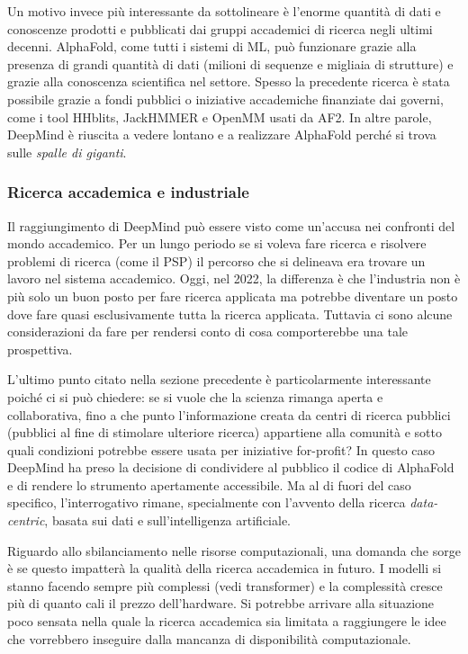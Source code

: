 {\par Un motivo invece più interessante da sottolineare è l'enorme quantità di dati e conoscenze prodotti e pubblicati dai gruppi accademici di ricerca negli ultimi decenni. AlphaFold, come tutti i sistemi di ML, può funzionare grazie alla presenza di grandi quantità di dati (milioni di sequenze e migliaia di strutture) e grazie alla conoscenza scientifica nel settore. Spesso la precedente ricerca è stata possibile grazie a fondi pubblici o iniziative accademiche finanziate dai governi, come i tool HHblits, JackHMMER e OpenMM usati da AF2. In altre parole, DeepMind è riuscita a vedere lontano e a realizzare AlphaFold perché si trova sulle \textit{spalle di giganti}.

\subsubsection{Ricerca accademica e industriale}

 \par Il raggiungimento di DeepMind può essere visto come un'accusa nei confronti del mondo accademico. Per un lungo periodo se si voleva fare ricerca e risolvere problemi di ricerca (come il PSP) il percorso che si delineava era trovare un lavoro nel sistema accademico. Oggi, nel 2022, la differenza è che l'industria non è più solo un buon posto per fare ricerca applicata ma potrebbe diventare un posto dove fare quasi esclusivamente tutta la ricerca applicata. Tuttavia ci sono alcune considerazioni da fare per rendersi conto di cosa comporterebbe una tale prospettiva.

\par L'ultimo punto citato nella sezione precedente è particolarmente interessante poiché ci si può chiedere: se si vuole che la scienza rimanga aperta e collaborativa, fino a che punto l'informazione creata da centri di ricerca pubblici (pubblici al fine di stimolare ulteriore ricerca) appartiene alla comunità e sotto quali condizioni potrebbe essere usata per iniziative for-profit?\supercite{blopigAF} In questo caso DeepMind ha preso la decisione di condividere al pubblico il codice di AlphaFold e di rendere lo strumento apertamente accessibile. Ma al di fuori del caso specifico, l'interrogativo rimane, specialmente con l'avvento della ricerca \textit{data-centric}, basata sui dati e sull'intelligenza artificiale.

\par Riguardo allo sbilanciamento nelle risorse computazionali, una domanda che sorge è se questo impatterà la qualità della ricerca accademica in futuro. I modelli si stanno facendo sempre più complessi (vedi transformer) e la complessità cresce più di quanto cali il prezzo dell'hardware. Si potrebbe arrivare alla situazione poco sensata nella quale la ricerca accademica sia limitata  a raggiungere le idee che vorrebbero inseguire dalla mancanza di disponibilità computazionale. 

}
